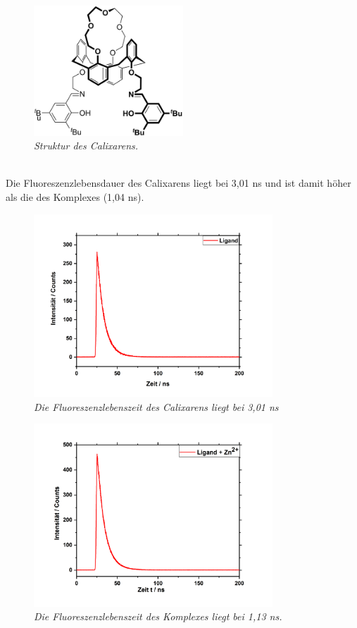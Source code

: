 \documentclass[12pt,a4paper]{report}
\begin{document}
		\begin{figure}[h!]
			\centering 
			\includegraphics[width=0.5\textwidth]{Calixarenligand.png}
			\caption{\textnormal{\textit{Struktur des Calixarens.}}}
			\label{fig:Calixaren}
		\end{figure}\\
	Die Fluoreszenzlebensdauer des Calixarens liegt bei 3,01 ns und ist damit höher als die des Komplexes (1,04 ns). 
		\begin{figure}[h!]
			\centering 
			\includegraphics[width=0.8\textwidth]{FLDLigand.jpg}
			\caption{\textnormal{\textit{Die Fluoreszenzlebenszeit des Calixarens liegt bei 3,01 ns}}}
			\label{fig:FLDCalixaren}
		\end{figure}
		\begin{figure}[h!]
			\centering 
			\includegraphics[width=0.8\textwidth]{FLDLigandZn.jpg}
			\caption{\textnormal{\textit{Die Fluoreszenzlebenszeit des Komplexes liegt bei 1,13 ns.}}}
			\label{fig:FLDKomplex}
		\end{figure}
	
\end{document}
